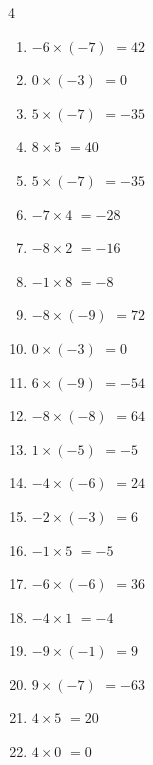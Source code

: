 \begin{multicols}{4}
\begin{enumerate}
  \item $-6\times (-7)$
        $=42$

  \item $0\times (-3)$
        $=0$

  \item $5\times (-7)$
        $=-35$

  \item $8\times 5$
        $=40$

  \item $5\times (-7)$
        $=-35$

  \item $-7\times 4$
        $=-28$

  \item $-8\times 2$
        $=-16$

  \item $-1\times 8$
        $=-8$

  \item $-8\times (-9)$
        $=72$

\columnbreak %

  \item $0\times (-3)$
        $=0$

  \item $6\times (-9)$
        $=-54$

  \item $-8\times (-8)$
        $=64$

  \item $1\times (-5)$
        $=-5$

  \item $-4\times (-6)$
        $=24$

  \item $-2\times (-3)$
        $=6$

  \item $-1\times 5$
        $=-5$

  \item $-6\times (-6)$
        $=36$

  \item $-4\times 1$
        $=-4$

  \item $-9\times (-1)$
        $=9$

  \item $9\times (-7)$
        $=-63$

  \item $4\times 5$
        $=20$

  \item $4\times 0$
        $=0$


\end{enumerate}
\end{multicols}
